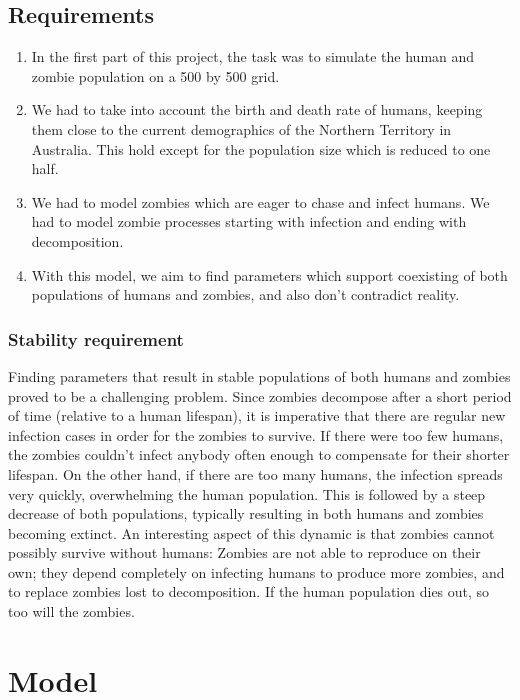 \documentclass[a4paper]{article}
\begin{document}
\subsection{Requirements}

\begin{enumerate}
\item In the first part of this project, the task was to simulate the human and zombie population on a 500 by 500 grid.
\item We had to take into account the birth and death rate of humans, keeping them close to the current demographics of the Northern Territory in Australia.
    This hold except for the population size which is reduced to one half. \cite{project}
\item We had to model zombies which are eager to chase and infect humans.
    We had to model zombie processes starting with infection and ending with decomposition.
\item With this model, we aim to find parameters which support coexisting of both populations of humans and zombies, and also don't contradict reality.
\end{enumerate}

\subsubsection{Stability requirement}

Finding parameters that result in stable populations of both humans and zombies proved to be a challenging problem.
Since zombies decompose after a short period of time (relative to a human lifespan), it is imperative that there are regular new infection cases in order for the zombies to survive.
If there were too few humans, the zombies couldn't infect anybody often enough to compensate for their shorter lifespan.
On the other hand, if there are too many humans, the infection spreads very quickly, overwhelming the human population. 
This is followed by a steep decrease of both populations, typically resulting in both humans and zombies becoming extinct.
An interesting aspect of this dynamic is that zombies cannot possibly survive without humans: Zombies are not able to reproduce on their own; they depend completely on infecting humans to produce more zombies, and to replace zombies lost to decomposition. 
If the human population dies out, so too will the zombies.

\section{Model} %
\end{document}
